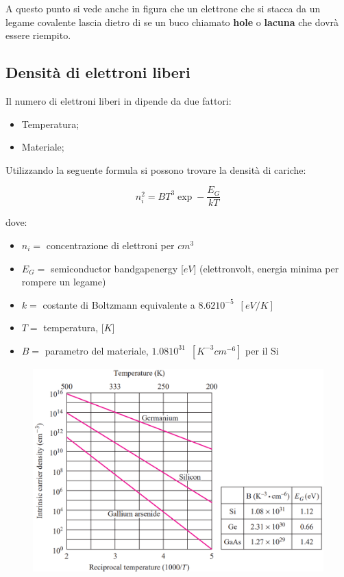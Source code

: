 A questo punto si vede anche in figura che un elettrone che si stacca da un legame covalente lascia dietro di se un buco chiamato \textbf{hole} o \textbf{lacuna} che dovrà essere riempito.

\subsection{Densità di elettroni liberi}
Il numero di elettroni liberi in dipende da due fattori:
\begin{itemize}
    \item Temperatura;
    \item Materiale;
\end{itemize}


Utilizzando la seguente formula si possono trovare la densità di cariche:

\begin{equation}
    n_i^2 = BT^3\exp -\frac{E_G}{kT} 
\end{equation}

dove:
\newpage
\begin{itemize}
    \item $n_i = $ concentrazione di elettroni per $cm^3$
    \item $E_G = $ semiconductor bandgapenergy [$eV$] (elettronvolt, energia minima per rompere un legame)
    \item $k = $ costante di Boltzmann equivalente a $8.62 10^{-5}\,\,\,[eV/K]$
    \item $T = $ temperatura, [$K$]
    \item $B =$ parametro del materiale, $1.08 10^{31}\,\,\,[K^{-3}cm^{-6}] $ per il Si
\end{itemize}

\begin{figure}[htbp]
    \centering
    \includegraphics[width=0.75\linewidth]{img/bandGap.png} 
\end{figure}

